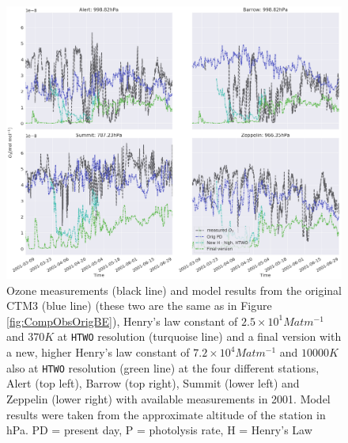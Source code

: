 \begin{figure}[ht]
    \centering
    \includegraphics[width=\linewidth]{Chapter6_Results/images/ozone_2001_step4.png}
    \caption{Ozone measurements (black line) and model results from the original CTM3 (blue line) (these two are the same as in Figure \ref{fig:CompObsOrigBE}), Henry's law constant of $2.5\times10^{1} M atm ^{-1}$ and $370 K$ at \texttt{HTWO} resolution (turquoise line) and a final version with a new, higher Henry's law constant of $7.2\times10^{4} M atm ^{-1}$ and $10 000 K$ also at \texttt{HTWO} resolution (green line) at the four different stations, Alert (top left), Barrow (top right), Summit (lower left) and Zeppelin (lower right) with available measurements in 2001. Model results were taken from the approximate altitude of the station in hPa. PD = present day, P = photolysis rate, H = Henry's Law}
    \label{fig:ozone_2001_step4}
\end{figure}